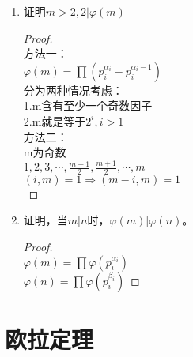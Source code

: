\documentclass[cn,10pt]{elegantbook}
\begin{document}
\begin{exercise}
  \begin{enumerate}
    \item 证明$m>2,2|\varphi(m)$
    \begin{proof}
      \\方法一：\\
      $\varphi(m) = \prod(p_i^{\alpha_i}-p_i^{\alpha_i-1}) $\\
      分为两种情况考虑：\\
      1.m含有至少一个奇数因子\\
      2.m就是等于$2^i,i>1$\\
      方法二：\\
      m为奇数\\
      $1,2,3,\cdots, \frac{m-1}{2}, \frac{m+1}{2},\cdots,m$\\
      $(i,m)=1 \Rightarrow (m-i,m)=1$\\
    \end{proof}
    \item 证明，当$m|n$时，$\varphi(m)|\varphi(n)$。
    \begin{proof}
      \\$\varphi(m) = \prod \varphi(p_i^{\alpha_i})$\\
      $\varphi(n) = \prod \varphi(p_i^{\beta_i})$
    \end{proof}
  \end{enumerate}
\end{exercise}
\section{欧拉定理}
\end{document}
